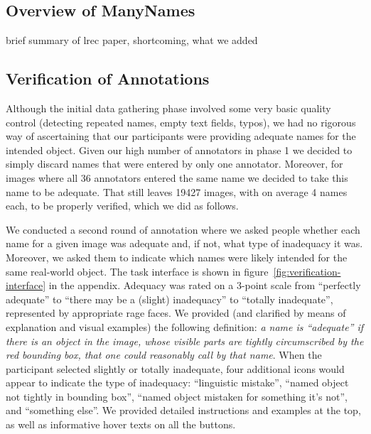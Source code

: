 

\subsection{Overview of ManyNames}
\label{sect:mn_overview}

brief summary of lrec paper, shortcoming, what we added

\subsection{Verification of Annotations}
\label{sect:mn_verification}


Although the initial data gathering phase involved some very basic quality control (detecting repeated names, empty text fields, typos), we had no rigorous way of ascertaining that our participants were providing adequate names for the intended object.
Given our high number of annotators in phase 1 we decided to simply discard names that were entered by only one annotator.
Moreover, for images where all 36 annotators entered the same name we decided to take this name to be adequate. 
That still leaves 19427 images, with on average 4 names each, to be properly verified, which we did as follows.

We conducted a second round of annotation where we asked people whether each name for a given image was adequate and, if not, what type of inadequacy it was.
Moreover, we asked them to indicate which names were likely intended for the same real-world object.
The task interface is shown in figure~\ref{fig:verification-interface} in the appendix.
Adequacy was rated on a 3-point scale from ``perfectly adequate'' to ``there may be a (slight) inadequacy'' to ``totally inadequate'', represented by appropriate rage faces.
We provided (and clarified by means of explanation and visual examples) the following definition: \textit{a name is ``adequate'' if there is an object in the image, whose visible parts are tightly circumscribed by the red bounding box, that one could reasonably call by that name}.
When the participant selected slightly or totally inadequate, four additional icons would appear to indicate the type of inadequacy: ``linguistic mistake'', ``named object not tightly in bounding box'', ``named object mistaken for something it's not'', and ``something else''.
We provided detailed instructions and examples at the top, as well as informative hover texts on all the buttons.

